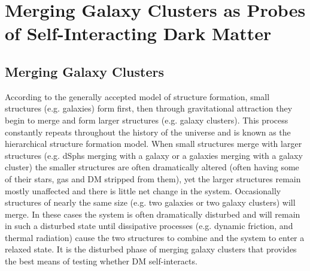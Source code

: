 \section{Merging Galaxy Clusters as Probes of Self-Interacting Dark Matter}

\subsection{Merging Galaxy Clusters}\label{Section:MergingClusters}

According to the generally accepted model of structure formation, small structures (e.g. galaxies) form first, then through gravitational attraction they begin to merge and form larger structures (e.g. galaxy clusters).
This process constantly repeats throughout the history of the universe and is known as the hierarchical structure formation model.
When small structures merge with larger structures (e.g. dSphs merging with a galaxy or a galaxies merging with a galaxy cluster) the smaller structures are often dramatically altered (often having some of their stars, gas and DM stripped from them), yet the larger structures remain mostly unaffected and there is little net change in the system.
Occasionally structures of nearly the same size (e.g. two galaxies or two galaxy clusters) will merge.
In these cases the system is often dramatically disturbed and will remain in such a disturbed state until dissipative processes (e.g. dynamic friction, and thermal radiation) cause the two structures to combine and the system to enter a relaxed state.
It is the disturbed phase of merging galaxy clusters that provides the best means of testing whether DM self-interacts.


